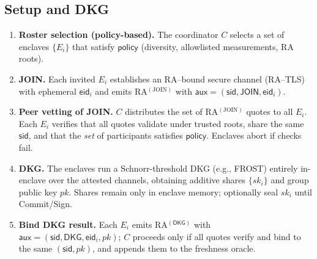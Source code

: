 \documentclass[runningheads,orivec]{llncs}
\newcommand{\FROST}{\textsf{FROST}}
\begin{document}
\subsection{Setup and DKG}
\begin{enumerate}[leftmargin=*,itemsep=0.25em]
  \item \textbf{Roster selection (policy-based).} The coordinator $C$ selects a set of enclaves $\{E_i\}$ that satisfy $\mathsf{policy}$ (diversity, allowlisted measurements, RA roots).
  \item \textbf{JOIN.} Each invited $E_i$ establishes an RA–bound secure channel (RA–TLS) with ephemeral $\mathsf{eid}_i$ and emits
        RA$^{(\mathrm{JOIN})}$ with $\mathsf{aux}=(\mathsf{sid},\mathsf{JOIN},\mathsf{eid}_i)$.
  \item \textbf{Peer vetting of JOIN.} $C$ distributes the set of RA$^{(\mathrm{JOIN})}$ quotes to all $E_i$.
        Each $E_i$ verifies that all quotes validate under trusted roots, share the same $\mathsf{sid}$,
        and that the \emph{set} of participants satisfies $\mathsf{policy}$. Enclaves abort if checks fail.
  \item \textbf{DKG.} The enclaves run a Schnorr-threshold DKG (e.g., \FROST{}) entirely in\mbox{-}enclave over the attested channels,
        obtaining additive shares $\{sk_i\}$ and group public key $pk$. Shares remain only in enclave memory; optionally seal $sk_i$ until Commit/Sign.
  \item \textbf{Bind DKG result.} Each $E_i$ emits RA$^{(\mathsf{DKG})}$ with $\mathsf{aux}=(\mathsf{sid},\mathsf{DKG},\mathsf{eid}_i,pk)$;
        $C$ proceeds only if all quotes verify and bind to the same $(\mathsf{sid},pk)$, and appends them to the freshness oracle.
\end{enumerate}
\end{document}
